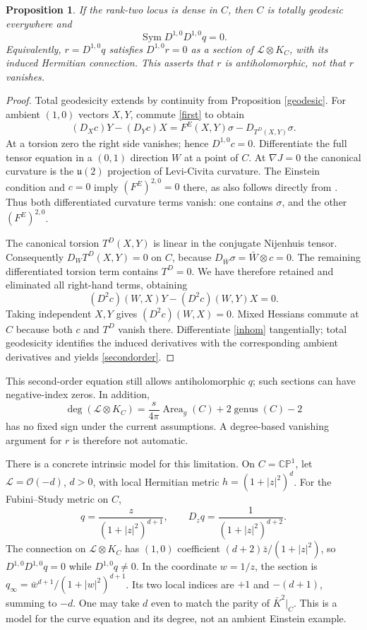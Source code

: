 \documentclass[11pt]{article}
\newtheorem{proposition}{Proposition}
\begin{document}
\begin{proposition}\label{second}
If the rank-two locus is dense in $C$, then $C$ is totally geodesic everywhere and
\begin{equation}\label{secondorder}
\operatorname{Sym}D^{1,0}D^{1,0}q=0.
\end{equation}
Equivalently, $r=D^{1,0}q$ satisfies $D^{1,0}r=0$ as a section of $\mathcal L\otimes K_C$, with its induced Hermitian connection. This asserts that $r$ is antiholomorphic, not that $r$ vanishes.
\end{proposition}
\begin{proof}
Total geodesicity extends by continuity from Proposition \ref{geodesic}. For ambient $(1,0)$ vectors $X,Y$, commute \eqref{first} to obtain
\[
(D_Xc)Y-(D_Yc)X
=F^E(X,Y)\sigma-D_{T^D(X,Y)}\sigma.
\]
At a torsion zero the right side vanishes; hence $D^{1,0}c=0$. Differentiate the full tensor equation in a $(0,1)$ direction $W$ at a point of $C$. At $\nabla J=0$ the canonical curvature is the $\mathfrak u(2)$ projection of Levi-Civita curvature. The Einstein condition and $c=0$ imply $(F^E)^{2,0}=0$ there, as also follows directly from \cite[(2.4)]{Ball}. Thus both differentiated curvature terms vanish: one contains $\sigma$, and the other $(F^E)^{2,0}$.

The canonical torsion $T^D(X,Y)$ is linear in the conjugate Nijenhuis tensor. Consequently $D_WT^D(X,Y)=0$ on $C$, because $D_{\bar W}\sigma=\bar W\otimes c=0$. The remaining differentiated torsion term contains $T^D=0$. We have therefore retained and eliminated all right-hand terms, obtaining
\[
(D^2c)(W,X)Y-(D^2c)(W,Y)X=0.
\]
Taking independent $X,Y$ gives $(D^2c)(W,X)=0$. Mixed Hessians commute at $C$ because both $c$ and $T^D$ vanish there. Differentiate \eqref{inhom} tangentially; total geodesicity identifies the induced derivatives with the corresponding ambient derivatives and yields \eqref{secondorder}.
\end{proof}
This second-order equation still allows antiholomorphic $q$; such sections can have negative-index zeros. In addition,
\[
\deg(\mathcal L\otimes K_C)
=\frac{s}{4\pi}\operatorname{Area}_g(C)+2\operatorname{genus}(C)-2
\]
has no fixed sign under the current assumptions. A degree-based vanishing argument for $r$ is therefore not automatic.

There is a concrete intrinsic model for this limitation. On $C=\mathbb{CP}^1$, let $\mathcal L=\mathcal O(-d)$, $d>0$, with local Hermitian metric $h=(1+|z|^2)^d$. For the Fubini--Study metric on $C$,
\[
q=\frac{z}{(1+|z|^2)^{d+1}},\qquad
D_zq=\frac1{(1+|z|^2)^{d+2}}.
\]
The connection on $\mathcal L\otimes K_C$ has $(1,0)$ coefficient $(d+2)\bar z/(1+|z|^2)$, so $D^{1,0}D^{1,0}q=0$ while $D^{1,0}q\ne0$. In the coordinate $w=1/z$, the section is $q_\infty=\bar w^{d+1}/(1+|w|^2)^{d+1}$. Its two local indices are $+1$ and $-(d+1)$, summing to $-d$. One may take $d$ even to match the parity of $\bar K^2|_C$. This is a model for the curve equation and its degree, not an ambient Einstein example.
\end{document}
